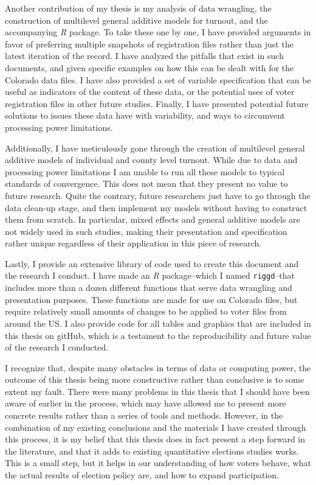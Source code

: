 \documentclass[12pt,twoside]{reedthesis}
\begin{document}
  Another contribution of my thesis is my analysis of data wrangling, the
  construction of multilevel general additive models for turnout, and the
  accompanying \textit{R} package. To take these one by one, I have
  provided arguments in favor of preferring multiple snapshots of
  registration files rather than just the latest iteration of the record.
  I have analyzed the pitfalls that exist in such documents, and given
  specific examples on how this can be dealt with for the Colorado data
  files. I have also provided a set of variable specification that can be
  useful as indicators of the content of these data, or the potential uses
  of voter registration files in other future studies. Finally, I have
  presented potential future solutions to issues these data have with
  variability, and ways to circumvent processing power limitations.
  
  Additionally, I have meticulously gone through the creation of
  multilevel general additive models of individual and county level
  turnout. While due to data and processing power limitations I am unable
  to run all these models to typical standards of convergence. This does
  not mean that they present no value to future research. Quite the
  contrary, future researchers just have to go through the data clean-up
  stage, and then implement my models without having to construct them
  from scratch. In particular, mixed effects and general additive models
  are not widely used in such studies, making their presentation and
  specification rather unique regardless of their application in this
  piece of research.
  
  Lastly, I provide an extensive library of code used to create this
  document and the research I conduct. I have made an \textit{R}
  package--which I named \texttt{riggd}--that includes more than a dozen
  different functions that serve data wrangling and presentation purposes.
  These functions are made for use on Colorado files, but require
  relatively small amounts of changes to be applied to voter files from
  around the US. I also provide code for all tables and graphics that are
  included in this thesis on gitHub, which is a testament to the
  reproducibility and future value of the research I conducted.
  
  I recognize that, despite many obstacles in terms of data or computing
  power, the outcome of this thesis being more constructive rather than
  conclusive is to some extent my fault. There were many problems in this
  thesis that I should have been aware of earlier in the process, which
  may have allowed me to present more concrete results rather than a
  series of tools and methods. However, in the combination of my existing
  conclusions and the materials I have created through this process, it is
  my belief that this thesis does in fact present a step forward in the
  literature, and that it adds to existing quantitative elections studies
  works. This is a small step, but it helps in our understanding of how
  voters behave, what the actual results of election policy are, and how
  to expand participation.
  
\end{document}
